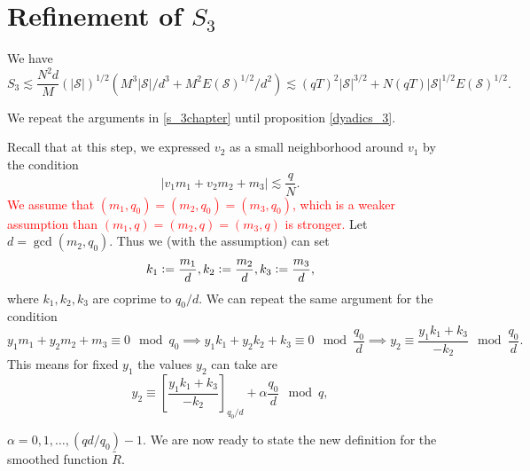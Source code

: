 \section{Refinement of $S_3$}

\begin{proposition} \label{s3refined}
    We have
    \[
S_3 \lesssim \frac{N^2d}{M}(|\mathcal{S}|)^{1/2}(M^3|\mathcal{S}|/d^3 + M^2E(\mathcal{S})^{1/2}/d^2)\lesssim (qT)^{2}|\mathcal{S}|^{3/2}+N(qT)|\mathcal{S}|^{1/2}E(\mathcal{S})^{1/2}.
\]
\end{proposition}
We repeat the arguments in \ref{s_3chapter} until proposition \ref{dyadics_3}.

Recall that at this step, we expressed $v_2$ as a small neighborhood around $v_1$ by the condition \[
|v_1m_1+v_2m_2+m_3|\lesssim \frac{q}{N}.
\] 
\textcolor{red}{We assume that $(m_1,q_0)=(m_2,q_0)=(m_3,q_0)$, which is a weaker assumption than $(m_1,q)=(m_2,q)=(m_3,q)$ is stronger.}
Let $d=\gcd(m_2,q_0)$. Thus we (with the assumption) can set \[
    k_1\mathrel{\mathop:}= \frac{m_1}{d},k_2\mathrel{\mathop:}= \frac{m_2}{d},k_3\mathrel{\mathop:}= \frac{m_3}{d},
\]
where $k_1,k_2,k_3$ are coprime to $q_0/d$.
We can repeat the same argument for the condition \[
y_1m_1+y_2m_2+m_3 \equiv 0 \mod q_0 \implies y_1k_1+y_2k_2+k_3 \equiv 0 \mod \frac{q_0}{d}
\implies y_2\equiv \frac{y_1k_1+k_3}{-k_2} \mod \frac{q_0}{d}.
\]
This means for fixed $y_1$ the values $y_2$ can take are \[
y_2 \equiv \left[\frac{y_1k_1+k_3}{-k_2}\right]_{q_0/d} + \alpha \frac{q_0}{d} \mod q,
\]

$\alpha=0,1,\ldots, (qd/q_0)-1$. We are now ready to state the new definition for the smoothed function $\tilde{R}$.

